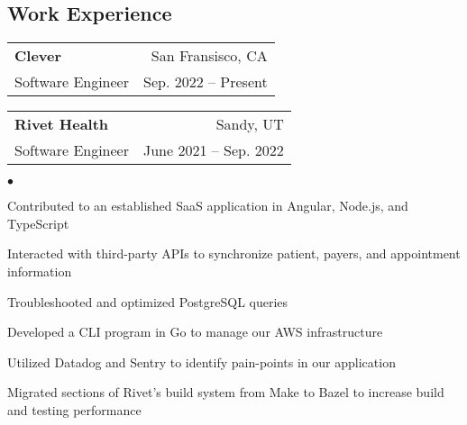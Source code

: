 \documentclass[margin, 11pt]{res}
\makeatletter
\newcommand{\li}{https://linkedin.com/in/jakegut}
\newcommand{\gh}{https://github.com/jakegut}
\newcommand{\personalsite}{https://jakegut.com}
\newcommand{\resumeSubheading}[4]{

\begin{tabular*}{1.01\textwidth}{@{\hspace{-4pt}}l @{\extracolsep{\fill}} r}
\textbf{#1} & #2 \\
      {#3} &  {#4}
\end{tabular*}\vspace{-2pt}
}
\newenvironment{list2}{
	\begin{list}{$\bullet$}{%
	    \small
		\setlength{\itemsep}{0in}
		\setlength{\parsep}{0in} \setlength{\parskip}{0in}
		\setlength{\topsep}{0in} \setlength{\partopsep}{0in}
		\setlength{\leftmargin}{0.2in}}}{\end{list}}
\makeatother
\begin{document}
\address{
    \small 979-676-3030 $|$ 
    \href{mailto:jakegut0108@gmail.com}{jakegut0108@gmail.com} $|$ 
    \href{\li}{linkedin.com/in/jakegut} $|$
    \href{\gh}{github.com/jakegut}
}

\begin{resume}

\section{\sc Work Experience}

\vspace{2pt}

\resumeSubheading{{\bf Clever}}{San Fransisco, CA}
                 {Software Engineer}{Sep. 2022 -- Present}
                 
\resumeSubheading{{\bf Rivet Health}}{Sandy, UT}
                 {Software Engineer}{June 2021 -- Sep. 2022}
                 
\begin{list2}
\item{Contributed to an established SaaS application in Angular, Node.js, and TypeScript}
\item{Interacted with third-party APIs to synchronize patient, payers, and appointment information}
\item{Troubleshooted and optimized PostgreSQL queries}
\item{Developed a CLI program in Go to manage our AWS infrastructure}
\item{Utilized Datadog and Sentry to identify pain-points in our application}
\item{Migrated sections of Rivet's build system from Make to Bazel to increase build and testing performance}
\end{list2}


\end{resume}
\end{document}
